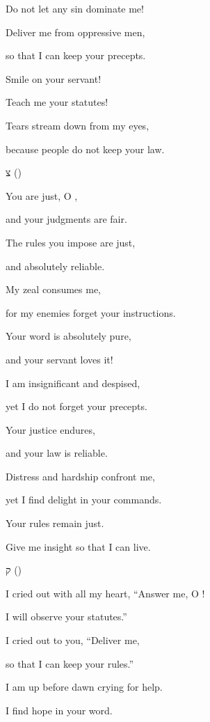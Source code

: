 {\par }{\Q Do not
let any
sin
dominate me!
\par }{\Q {}Deliver
me from oppressive
men,
\par }{\Q so that I can keep
your precepts.
\par }{\Q {}Smile
on your servant!
\par }{\Q Teach
me your statutes!
\par }{\Q {}Tears
stream
down
from my eyes,
\par }{\Q because
people do not
keep
your law.
\par }{\SH צ ({})
\par }{\Q {}You are just, O
{},
\par }{\Q and your judgments are fair.
\par }{\Q {}The rules
you impose
are just,
\par }{\Q and absolutely
reliable.
\par }{\Q {}My zeal
consumes
me,
\par }{\Q for
my enemies
forget
your instructions.
\par }{\Q {}Your word
is absolutely
pure,
\par }{\Q and your servant
loves it!
\par }{\Q {}I am
insignificant
and despised,
\par }{\Q yet I do not
forget
your precepts.
\par }{\Q {}Your justice
endures,
\par }{\Q and your law
is reliable.
\par }{\Q {}Distress
and hardship
confront
me,
\par }{\Q yet I find delight
in your commands.
\par }{\Q {}Your rules
remain
just.
\par }{\Q Give me insight
so that I can live.
\par }{\SH ק ({})
\par }{\Q {}I cried out with all my heart, “Answer me, O
{}!
\par }{\Q I will observe your statutes.”
\par }{\Q {}I cried
out to you, “Deliver
me,
\par }{\Q so that I can keep
your rules.”
\par }{\Q {}I am up before
dawn
crying for help.
\par }{\Q I find hope
in your word.
}
